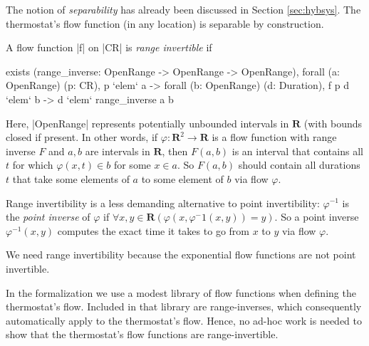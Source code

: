 \documentclass[runningheads]{llncs}
\def\phi{\varphi}
\newcommand{\weg}[1]{}
\newcommand{\IR}{{\mathbf R}}
\begin{document}

The notion of {\em separability\/} has already been discussed in
Section \ref{sec:hybsys}.
The thermostat's flow function (in any
location) is separable by construction.

A flow function |f| on |CR| is {\em range invertible\/} if
\begin{code}
  exists (range_inverse: OpenRange -> OpenRange -> OpenRange),
    forall (a: OpenRange) (p: CR), p `elem` a ->
    forall (b: OpenRange) (d: Duration), f p d `elem` b -> d `elem` range_inverse a b
\end{code}
Here, |OpenRange| represents potentially unbounded intervals in $\IR$
(with bounds closed if present. In other words, if $\phi : \IR^2
\rightarrow \IR$ is a flow function with range inverse $F$ and $a,b$
are intervals in $\IR$, then $F(a,b)$ is an interval that contains all
$t$ for which $\phi(x,t)\in b$ for some $x\in a$. So $F(a,b)$ should
contain all durations $t$ that take some elements of $a$ to some
element of $b$ via flow $\phi$.

Range invertibility is a less demanding alternative to point invertibility: $\phi^{-1}$ is the {\em point inverse\/} of $\phi$ if $\forall x,y\in \IR (\phi (x, \phi^-1(x,y)) =y)$. So a point inverse $\phi^{-1}(x,y)$ computes the exact time it takes to go from $x$ to $y$ via flow $\phi$.
\weg{
\begin{code}
  exists (point_inverse: CR -> CR -> CR), forall p q: CR, f p (point_inverse p q) = q
\end{code}
}
We need range invertibility because the exponential flow functions are
not point invertible.

In the formalization we use a modest library
of flow functions when defining the thermostat's flow. Included in
that library are range-inverses, which consequently automatically
apply to the thermostat's flow. Hence, no ad-hoc work is needed to
show that the thermostat's flow functions are range-invertible.
\end{document}
